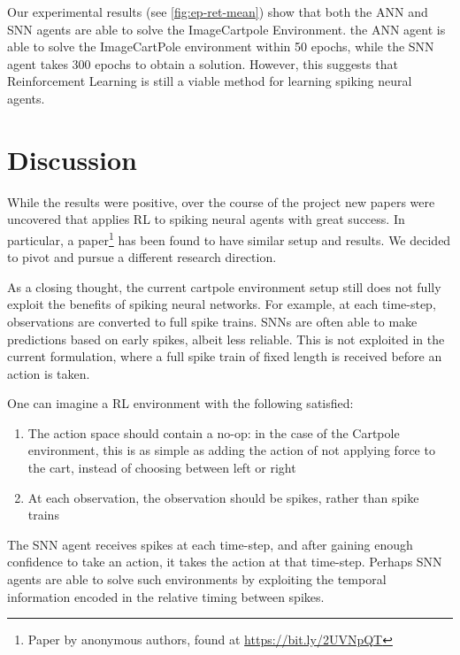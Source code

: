 \documentclass[fyp]{socreport}
\begin{document}
Our experimental results (see \autoref{fig:ep-ret-mean}) show that both the ANN
and SNN agents are able to solve the ImageCartpole Environment. the ANN agent is
able to solve the ImageCartPole environment within 50 epochs, while the SNN
agent takes 300 epochs to obtain a solution. However, this suggests that
Reinforcement Learning is still a viable method for learning spiking neural
agents.

\section{Discussion}

While the results were positive, over the course of the project new papers were
uncovered that applies RL to spiking neural agents with great success. In
particular, a paper\footnote{Paper by anonymous authors, found at
  \url{https://bit.ly/2UVNpQT}} has been found to have similar setup and
results. We decided to pivot and pursue a different research direction.

As a closing thought, the current cartpole environment setup still does not
fully exploit the benefits of spiking neural networks. For example, at each
time-step, observations are converted to full spike trains. SNNs are often able
to make predictions based on early spikes, albeit less reliable. This is not
exploited in the current formulation, where a full spike train of fixed length
is received before an action is taken.

One can imagine a RL environment with the following satisfied:

\begin{enumerate}
  \item The action space should contain a no-op: in the case of the Cartpole
    environment, this is as simple as adding the action of not applying force to
    the cart, instead of choosing between left or right
  \item At each observation, the observation should be spikes, rather than spike
    trains
\end{enumerate}

The SNN agent receives spikes at each time-step, and after gaining enough
confidence to take an action, it takes the action at that time-step. Perhaps SNN
agents are able to solve such environments by exploiting the temporal
information encoded in the relative timing between spikes.
\end{document}
